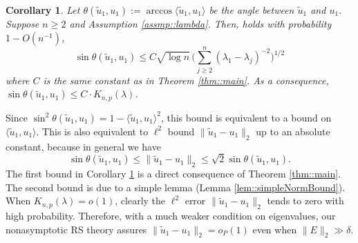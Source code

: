 \documentclass[12pt]{article}%
\theoremstyle{plain}%
\newtheorem{cor}{Corollary}[section]
\theoremstyle{remark}
\begin{document}
\begin{cor}\label{cor::main}
Let $\theta(\tilde{u}_1, u_1) := \arccos \langle \tilde{u}_1, u_1 \rangle$ be the angle between $\tilde{u}_1$ and $u_1$. Suppose $n \ge 2$ and Assumption \ref{assmp::lambda}. Then, holds with probability $1 - O(n^{-1})$,
\begin{equation}\label{ineqn::main2}
\sin \theta(\tilde{u}_1, u_1) \le C\sqrt{\log n}\, \big( \sum_{j \ge 2}^n (\lambda_1  - \lambda_j)^{-2} \big)^{1/2}
\end{equation}
where $C$ is the same constant as in Theorem \ref{thm::main}. As a consequence, $\sin \theta(\tilde{u}_1, u_1) \le C \cdot K_{n,p}(\lambda)$.
\end{cor}

Since $\sin^2 \theta(\tilde{u}_1, u_1) = 1 - \langle \tilde{u}_1, u_1 \rangle^2$, this bound is equivalent to a bound on $\langle \tilde{u}_1, u_1 \rangle$. This is also equivalent to $\ell^2$ bound $\| \tilde{u}_1 - u_1 \|_2$ up to an absolute constant, because in general we have
\begin{equation*}
\sin \theta(\tilde{u}_1, u_1) \le \| \tilde{u}_1 - u_1 \|_2 \le \sqrt{2} \sin \theta(\tilde{u}_1, u_1).
\end{equation*}
The first bound in Corollary \ref{cor::main} is a direct consequence of Theorem \ref{thm::main}. The second bound is due to a simple lemma (Lemma \ref{lem::simpleNormBound}). When $K_{n,p}(\lambda) = o(1)$, clearly the $\ell^2$ error $\| \tilde{u}_1 - u_1 \|_2$ tends to zero with high probability. Therefore, with a much weaker condition on eigenvalues, our nonasymptotic RS theory assures $\| \tilde{u}_1 - u_1 \|_2 = o_P(1)$ even when $\| E \|_2 \gg \delta$.
\end{document}
